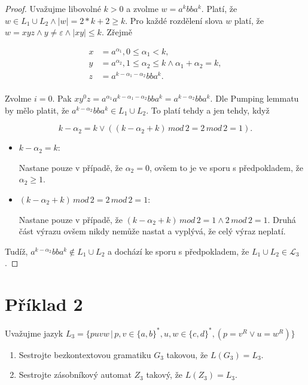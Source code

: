 \documentclass[a4paper, 12pt]{article}
\theoremstyle{definition}
\theoremstyle{definition}
\theoremstyle{definition}
\theoremstyle{remark}
\begin{document}
\begin{itemize}
\begin{proof}
        Uvažujme libovolné $k > 0$ a zvolme $w = a^kbba^k$. Platí, že $w \in L_1 \cup L_2 \wedge |w| = 2 * k + 2 \geq k$. Pro každé rozdělení slova $w$ platí, že $w = xyz \wedge y \neq \varepsilon \wedge |xy| \leq k$. Zřejmě

        \begin{align*}
            x &= a^{\alpha_1}, 0 \leq \alpha_1 < k, \\
            y &= a^{\alpha_2}, 1 \leq \alpha_2 \leq k \wedge \alpha_1 + \alpha_2 = k, \\
            z &= a^{k - \alpha_1 - \alpha_2}bba^k. \\
        \end{align*}

        Zvolme $i = 0$. Pak $xy^0z = a^{\alpha_1}a^{k - \alpha_1 - \alpha_2}bba^k = a^{k - \alpha_2}bba^k$. Dle Pumping lemmatu by mělo platit, že $a^{k - \alpha_2}bba^k \in L_1 \cup L_2$. To platí tehdy a jen tehdy, když
        
        $$k - \alpha_2 = k \lor ((k - \alpha_2 + k) \, mod \, 2 = 2 \, mod \, 2 = 1).$$
        
        \begin{itemize}
            \item $k - \alpha_2 = k$:
            
            Nastane pouze v případě, že $\alpha_2 = 0$, ovšem to je ve sporu s předpokladem, že $\alpha_2 \geq 1$.
            \item $(k - \alpha_2 + k) \, mod \, 2 = 2 \, mod \, 2 = 1$:
            
            Nastane pouze v případě, že $(k - \alpha_2 + k) \, mod \, 2 = 1 \wedge 2 \, mod \, 2 = 1$. Druhá část výrazu ovšem nikdy nemůže nastat a vyplývá, že celý výraz neplatí.
        \end{itemize}
        Tudíž, $a^{k - \alpha_2}bba^k \notin L_1 \cup L_2$ a dochází ke sporu s předpokladem, že $L_1 \cup L_2 \in \mathcal{L}_3$.
    \end{proof}
\end{itemize}

\section{Příklad 2}
Uvažujme jazyk $L_3 = \{puvw \, | \, p, v \in \{a,b\}^\ast, u, w \in \{c,d\}^\ast, (p = v^R \lor u = w^R)\}$

\begin{enumerate}[label=(\alph*)]
    \item Sestrojte bezkontextovou gramatiku $G_3$ takovou, že $L(G_3) = L_3$.
    \item Sestrojte zásobníkový automat $Z_3$ takový, že $L(Z_3) = L_3$.
\end{enumerate}
\end{document}
